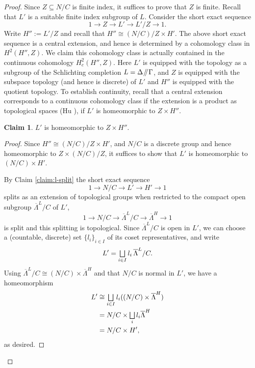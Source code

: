 \documentclass[JEP,XML,SOM,Unicode,published]{cedram}
\let\oldbigsqcup\bigsqcup
\renewcommand{\bigsqcup}{\mathop{\textstyle\oldbigsqcup}\displaylimits}
\newcommand{\sslash}{\mathbin{\mkern-3mu /\mkern-5mu/ \mkern-3mu}}
\theoremstyle{definition}
\newtheorem{claim}[thm]{Claim}
\begin{document}
\begin{proof} Since $Z\subseteq N/C$ is finite index, it suffices to prove that $Z$ is finite. Recall that $L'$ is a suitable finite index subgroup of $L$. Consider the short exact sequence
\begin{equation}\label{eq:ses-z}
1\to Z\to L'\to L'/Z\to 1.
\end{equation}
Write $H'':=L'/Z$ and recall that $H''\cong (N/C)/Z\times H'$. The above short exact sequence is a central extension, and hence is determined by a cohomology class in $H^2(H'',Z)$. We claim this cohomology class is actually contained in the continuous cohomology $H^2_c(H'',Z)$. Here $L'$ is equipped with the topology as a subgroup of the Schlichting completion $L=\Delta\sslash\Gamma$, and $Z$ is equipped with the subspace topology (and hence is discrete) of $L'$ and $H''$ is equipped with the quotient topology. To establish continuity, recall that a central extension corresponds to a continuous cohomology class if the extension is a product as topological spaces (Hu \cite[5.3]{Hu-cohomology}), \ie if $L'$ is homeomorphic to $Z \times H''$.
\begin{claim}\label{claim:top-split}
$L'$ is homeomorphic to $Z\times H''$.
\end{claim}
\begin{proof} Since $H''\cong (N/C)/Z\times H'$, and $N/C$ is a discrete group and hence homeomorphic to $Z\times (N/C)/Z$, it suffices to show that $L'$ is homeomorphic to $(N/C)\times H'$.

By Claim \ref{claim:l-split} the short exact sequence
\[
1\to N/C\to L'\to H'\to 1
\]
splits as an extension of topological groups when restricted to the compact open subgroup $\overline{\Lambda}^L/C$ of $L'$, \ie
\[
1\to N/C\to \overline{\Lambda}^L/C\to \overline{\Lambda}^H\to 1
\]
is split and this splitting is topological. Since $\overline{\Lambda}^L/C$ is open in $L'$, we can choose a (countable, discrete) set $\{l_i\}_{i\in I}$ of its coset representatives, and write
\[
L'=\bigsqcup_{i\in I} l_i \, \overline{\Lambda}^L/C.
\]
Using $\overline{\Lambda}^L/C\cong (N/C)\times \overline{\Lambda}^H$ and that $N/C$ is normal in $L'$, we have a homeomorphism
\begin{align*}
L' &\cong \bigsqcup_{i\in I} l_i ((N/C)\times \overline{\Lambda}^H) \\
&= N/C\times \bigsqcup_i l_i \overline{\Lambda}^H \\
&=N/C \times H',
\end{align*}
as desired.\end{proof}


\end{proof}
\end{document}
